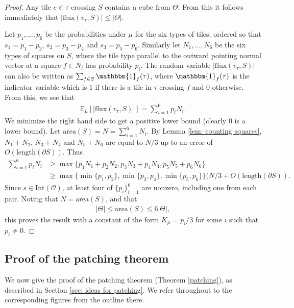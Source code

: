 \documentclass[11pt]{article}
\theoremstyle{remark}
\theoremstyle{definition}
\newcommand{\mc}[1]{\mathcal{#1}}
\newcommand{\m}[1]{\mathbb{#1}}
\begin{document}
\begin{proof}
    Any tile $e\in \tau$ crossing $S$ contains a cube from $\Theta$. From this it follows immediately that $|\text{flux}(v_\tau,S)| \leq |\Theta|$.
    
    Let $p_1,\dots,p_6$ be the probabilities under $\mu$ for the six types of tiles, ordered so that $s_1 = p_1 - p_2$, $s_2 = p_3 - p_4$ and $s_3 = p_5 - p_6$. Similarly let $N_1,\dots,N_6$ be the six types of squares on $S$, where the tile type parallel to the outward pointing normal vector at a square $f\in N_i$ has probability $p_i$. The random variable $|\text{flux}(v_\tau,S)|$ can also be written as $\sum_{f\in S} \mathbbm{1}_f(\tau)$, where $\mathbbm{1}_f(\tau)$ is the indicator variable which is $1$ if there is a tile in $\tau$ crossing $f$ and $0$ otherwise. From this, we see that
    \begin{align*}
        \m E_{\mu}[|\text{flux}(v_\tau,S)|] = \sum_{i=1}^6 p_i N_i. 
    \end{align*}
    We minimize the right hand side to get a positive lower bound (clearly $0$ is a lower bound). Let $\text{area}(S)=N= \sum_{i=1}^6 N_i$. By Lemma \ref{lem: counting squares}, $N_1+N_2$, $N_3+N_4$ and $N_5+N_6$ are equal to $N/3$ up to an error of $O(\text{length}(\partial S))$. Thus
    \begin{align*}
        \sum_{i=1}^6 p_i N_i &\geq \max\{p_1 N_1 + p_2 N_2,p_3 N_3 + p_4 N_4, p_5 N_5+p_6 N_6\} \\
        &\geq \max\{\min\{p_1,p_2\},\min\{p_3,p_4\},\min\{p_5,p_6\}\} (N/3 + O(\text{length}(\partial S)). 
    \end{align*}
    Since $s\in \text{Int}(\mc O)$, at least four of $\{p_i\}_{i=1}^6$ are nonzero, including one from each pair. Noting that $N = \text{area}(S)$, and that
    \begin{align*}
    |\Theta| \leq \text{area}(S) \leq 6|\Theta|,
    \end{align*}
    this proves the result with a constant of the form $K_\mu = p_i/3$ for some $i$ such that $p_i\neq 0$.
\end{proof}

\subsection{Proof of the patching theorem}\label{sec: patching proof}

We now give the proof of the {patching theorem} (Theorem \ref{patching}), as described in Section \ref{sec: ideas for patching}. We refer throughout to the corresponding figures from the outline there.
\end{document}
